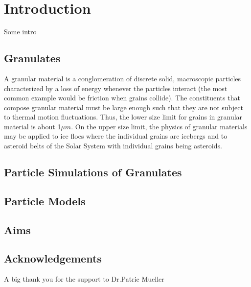 %
% 


\chapter{Introduction}

Some intro

\section{Granulates}

A granular material is a conglomeration of discrete solid, macroscopic particles characterized by a loss of energy whenever the particles interact (the most common example would be friction when grains collide). The constituents that compose granular material must be large enough such that they are not subject to thermal motion fluctuations. Thus, the lower size limit for grains in granular material is about 1$\mu m$. On the upper size limit, the physics of granular materials may be applied to ice floes where the individual grains are icebergs and to asteroid belts of the Solar System with individual grains being asteroids. \citep{duran}

\section{Particle Simulations of Granulates}


\section{Particle Models}


\section{Aims}


\section{Acknowledgements}

A big thank you for the support to Dr.Patric Mueller

